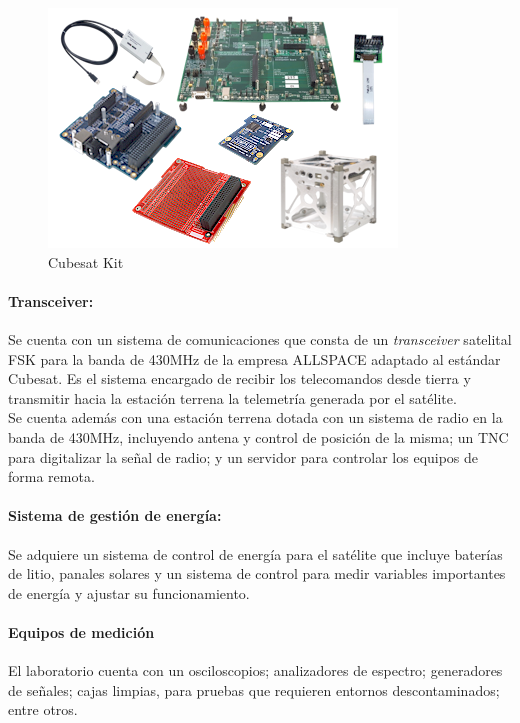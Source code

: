 \documentclass[11pt,letterpaper]{article}
\begin{document}
\begin{figure}[!h] 
\centering \includegraphics[scale=0.8]{img/cubesatkit.jpg}
\caption{Cubesat Kit} \label{cubesatkit}
\end{figure}

\paragraph{Transceiver:}
Se cuenta con un sistema de comunicaciones que consta de un \textit{transceiver} satelital FSK para la banda de 430MHz de la empresa ALLSPACE adaptado al estándar Cubesat. Es el sistema encargado de recibir los telecomandos desde tierra y transmitir hacia la estación terrena la telemetría generada por el satélite.\\

Se cuenta además con una estación terrena dotada con un sistema de radio en la banda de 430MHz, incluyendo antena y control de posición de la misma; un TNC para digitalizar la señal de radio; y un servidor para controlar los equipos de forma remota.

\paragraph{Sistema de gestión de energía:}
Se adquiere un sistema de control de energía para el satélite que incluye baterías de litio, panales solares y un sistema de control para medir variables importantes de energía y ajustar su funcionamiento.

\paragraph{Equipos de medición}
El laboratorio cuenta con un osciloscopios; analizadores de espectro; generadores de señales; cajas limpias, para pruebas que requieren entornos descontaminados; entre otros.
\end{document}
